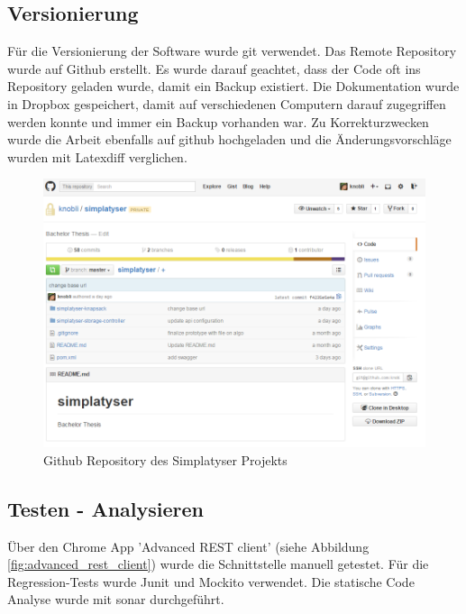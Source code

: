 \newpage

\subsection{Versionierung}
Für die Versionierung der Software wurde git \cite{git} verwendet. Das Remote Repository wurde auf Github \cite{github_simplatyzer} erstellt. Es wurde darauf geachtet, dass 
der Code oft ins Repository geladen wurde, damit ein Backup existiert. Die Dokumentation wurde in Dropbox gespeichert, damit auf verschiedenen Computern darauf zugegriffen werden konnte 
und immer ein Backup vorhanden war. Zu Korrekturzwecken wurde die Arbeit ebenfalls auf github hochgeladen und die Änderungsvorschläge wurden mit Latexdiff verglichen.

\begin{figure}[h]
\centering
\includegraphics[scale=0.6]{images/github.png}
\caption[Github Repository des Simplatyser Projekts]{Github Repository des Simplatyser Projekts \selfmade{}}
\label{fig:github_repo}
\end{figure}

\FloatBarrier
\newpage

\subsection{Testen - Analysieren}
 Über den Chrome App 'Advanced REST client' (siehe Abbildung \ref{fig:advanced_rest_client})  wurde die Schnittstelle manuell getestet. Für die Regression-Tests wurde Junit und Mockito 
verwendet. Die statische Code Analyse wurde mit \gls{sonar} \cite{sonar} durchgeführt.

